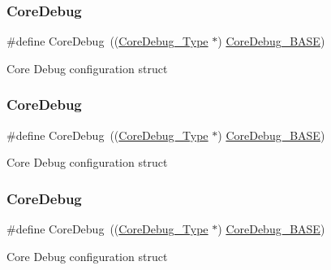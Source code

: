 \subsubsection{\texorpdfstring{CoreDebug}{CoreDebug}\hspace{0.1cm}{\footnotesize\ttfamily [1/3]}}
{\footnotesize\ttfamily \#define Core\+Debug~((\mbox{\hyperlink{struct_core_debug___type}{Core\+Debug\+\_\+\+Type}} $\ast$)     \mbox{\hyperlink{group___c_m_s_i_s__core__base_ga680604dbcda9e9b31a1639fcffe5230b}{Core\+Debug\+\_\+\+B\+A\+SE}})}

Core Debug configuration struct \mbox{\label{group___c_m_s_i_s__core__base_gab6e30a2b802d9021619dbb0be7f5d63d}} 
\subsubsection{\texorpdfstring{CoreDebug}{CoreDebug}\hspace{0.1cm}{\footnotesize\ttfamily [2/3]}}
{\footnotesize\ttfamily \#define Core\+Debug~((\mbox{\hyperlink{struct_core_debug___type}{Core\+Debug\+\_\+\+Type}} $\ast$)     \mbox{\hyperlink{group___c_m_s_i_s__core__base_ga680604dbcda9e9b31a1639fcffe5230b}{Core\+Debug\+\_\+\+B\+A\+SE}})}

Core Debug configuration struct \mbox{\label{group___c_m_s_i_s__core__base_gab6e30a2b802d9021619dbb0be7f5d63d}} 
\subsubsection{\texorpdfstring{CoreDebug}{CoreDebug}\hspace{0.1cm}{\footnotesize\ttfamily [3/3]}}
{\footnotesize\ttfamily \#define Core\+Debug~((\mbox{\hyperlink{struct_core_debug___type}{Core\+Debug\+\_\+\+Type}} $\ast$)     \mbox{\hyperlink{group___c_m_s_i_s__core__base_ga680604dbcda9e9b31a1639fcffe5230b}{Core\+Debug\+\_\+\+B\+A\+SE}})}

Core Debug configuration struct \mbox{\label{group___c_m_s_i_s__core__base_ga680604dbcda9e9b31a1639fcffe5230b}} 
